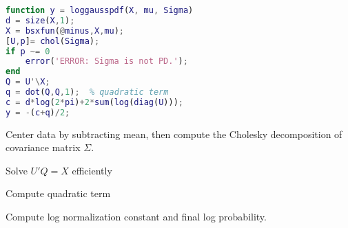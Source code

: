 \documentclass[11pt]{article}
\begin{document}
\begin{minipage}{\textwidth}
\begin{minipage}[t]{0.48\textwidth}
\begin{lstlisting}[language=Matlab, firstnumber=127]
function y = loggausspdf(X, mu, Sigma)
d = size(X,1);
X = bsxfun(@minus,X,mu);
[U,p]= chol(Sigma);
if p ~= 0
    error('ERROR: Sigma is not PD.');
end
Q = U'\X;
q = dot(Q,Q,1);  % quadratic term
c = d*log(2*pi)+2*sum(log(diag(U)));
y = -(c+q)/2;
\end{lstlisting}
\end{minipage}
\hfill
\begin{minipage}[t]{0.48\textwidth}
    
Center data by subtracting mean, then compute the Cholesky decomposition of covariance matrix $\Sigma$.

Solve $U'Q = X$ efficiently

Compute quadratic term

Compute log normalization constant and final log probability.
\end{minipage}
\end{minipage}
\end{document}
